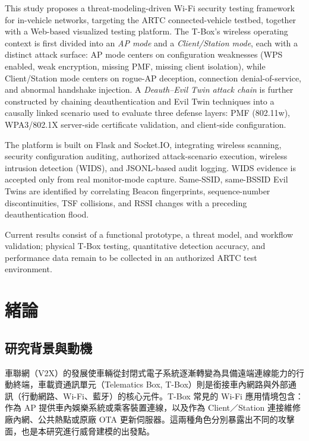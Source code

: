 \documentclass[12pt,a4paper,oneside]{report}
\begin{document}
This study proposes a threat-modeling-driven Wi-Fi security testing framework for in-vehicle networks, targeting the ARTC connected-vehicle testbed, together with a Web-based visualized testing platform. The T-Box's wireless operating context is first divided into an \emph{AP mode} and a \emph{Client/Station mode}, each with a distinct attack surface: AP mode centers on configuration weaknesses (WPS enabled, weak encryption, missing PMF, missing client isolation), while Client/Station mode centers on rogue-AP deception, connection denial-of-service, and abnormal handshake injection. A \emph{Deauth--Evil Twin attack chain} is further constructed by chaining deauthentication and Evil Twin techniques into a causally linked scenario used to evaluate three defense layers: PMF (802.11w), WPA3/802.1X server-side certificate validation, and client-side configuration.

The platform is built on Flask and Socket.IO, integrating wireless scanning, security configuration auditing, authorized attack-scenario execution, wireless intrusion detection (WIDS), and JSONL-based audit logging. WIDS evidence is accepted only from real monitor-mode capture. Same-SSID, same-BSSID Evil Twins are identified by correlating Beacon fingerprints, sequence-number discontinuities, TSF collisions, and RSSI changes with a preceding deauthentication flood.

Current results consist of a functional prototype, a threat model, and workflow validation; physical T-Box testing, quantitative detection accuracy, and performance data remain to be collected in an authorized ARTC test environment.

\tableofcontents
\listoftables
\clearpage
{}

\chapter{緒論}

\section{研究背景與動機}
車聯網（V2X）的發展使車輛從封閉式電子系統逐漸轉變為具備遠端連線能力的行動終端，車載資通訊單元（Telematics Box, T-Box）則是銜接車內網路與外部通訊（行動網路、Wi-Fi、藍牙）的核心元件。T-Box 常見的 Wi-Fi 應用情境包含：作為 AP 提供車內娛樂系統或乘客裝置連線，以及作為 Client／Station 連接維修廠內網、公共熱點或原廠 OTA 更新伺服器。這兩種角色分別暴露出不同的攻擊面，也是本研究進行威脅建模的出發點。
\end{document}
